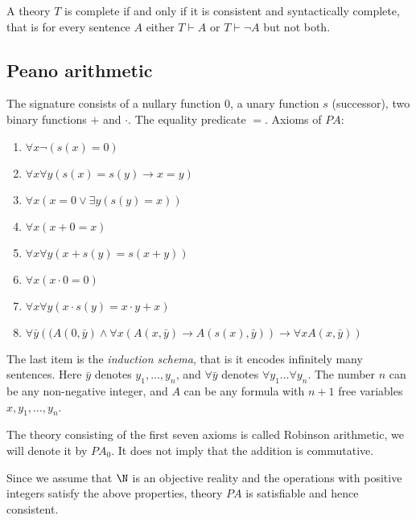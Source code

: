 \begin{page}
\setcounter{section}{3}
\setcounter{subsection}{2}
\setcounter{dfn}{24}
\label{portion:730}

\begin{cor}
A theory $T$ is complete if and only if it is consistent and syntactically complete,
that is for every sentence $A$ either $T \vdash A$ or $T \vdash \neg A$ but not both.
\end{cor}

\end{page}

\begin{page}
\setcounter{section}{3}
\setcounter{subsection}{4}
\setcounter{dfn}{24}
\label{portion:733}

\subsection{Peano arithmetic}
The signature consists of a nullary function $0$, a unary function $s$ (successor), two binary functions $+$ and $\cdot$.
The equality predicate $=$.
Axioms of $PA$:
\begin{enumerate}
\item
$\forall x \neg(s(x) = 0)$
\item
$\forall x \forall y (s(x)=s(y) \to x=y)$
\item
$\forall x (x = 0 \vee \exists y (s(y)=x))$
\item
$\forall x (x+0=x)$
\item
$\forall x \forall y (x+s(y) = s(x+y))$
\item
$\forall x (x \cdot 0 = 0)$
\item
$\forall x \forall y (x \cdot s(y) = x \cdot y + x)$
\item
$\forall \bar y \left((A(0, \bar y) \wedge \forall x (A(x, \bar y) \to A(s(x), \bar y)) \to \forall x A(x, \bar y)\right)$
\end{enumerate}
The last item is the \emph{induction schema}, that is it encodes infinitely many sentences.
Here $\bar y$ denotes $y_1, \ldots, y_n$, and $\forall \bar y$ denotes $\forall y_1 \ldots \forall y_n$.
The number $n$ can be any non-negative integer, and $A$ can be any formula with $n+1$ free variables $x, y_1, \ldots, y_n$.


The theory consisting of the first seven axioms is called Robinson arithmetic, we will denote it by $PA_0$.
It does not imply that the addition is commutative.

Since we assume that $\N$ is an objective reality and the operations with positive integers satisfy the above properties,
theory $PA$ is satisfiable and hence consistent.






\end{page}

